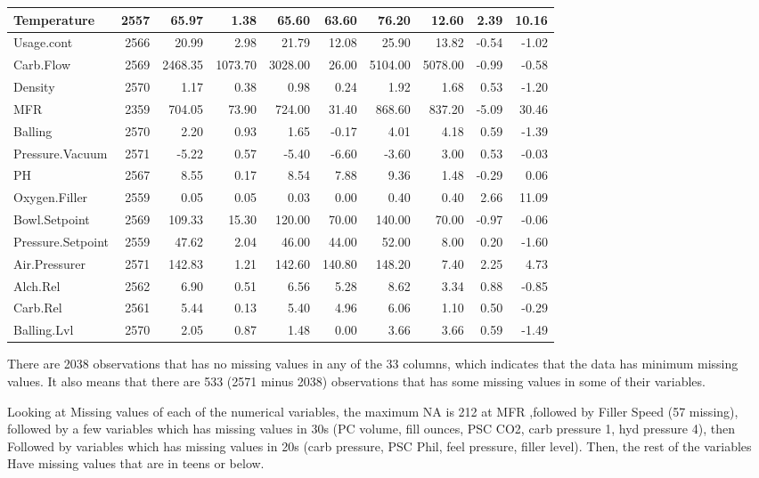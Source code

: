 \documentclass[]{article}
\begin{document}
\begin{table}
\begin{tabular}[t]{l|r|r|r|r|r|r|r|r|r}
\hline
Temperature & 2557 & 65.97 & 1.38 & 65.60 & 63.60 & 76.20 & 12.60 & 2.39 & 10.16\\
\hline
Usage.cont & 2566 & 20.99 & 2.98 & 21.79 & 12.08 & 25.90 & 13.82 & -0.54 & -1.02\\
\hline
Carb.Flow & 2569 & 2468.35 & 1073.70 & 3028.00 & 26.00 & 5104.00 & 5078.00 & -0.99 & -0.58\\
\hline
Density & 2570 & 1.17 & 0.38 & 0.98 & 0.24 & 1.92 & 1.68 & 0.53 & -1.20\\
\hline
MFR & 2359 & 704.05 & 73.90 & 724.00 & 31.40 & 868.60 & 837.20 & -5.09 & 30.46\\
\hline
Balling & 2570 & 2.20 & 0.93 & 1.65 & -0.17 & 4.01 & 4.18 & 0.59 & -1.39\\
\hline
Pressure.Vacuum & 2571 & -5.22 & 0.57 & -5.40 & -6.60 & -3.60 & 3.00 & 0.53 & -0.03\\
\hline
PH & 2567 & 8.55 & 0.17 & 8.54 & 7.88 & 9.36 & 1.48 & -0.29 & 0.06\\
\hline
Oxygen.Filler & 2559 & 0.05 & 0.05 & 0.03 & 0.00 & 0.40 & 0.40 & 2.66 & 11.09\\
\hline
Bowl.Setpoint & 2569 & 109.33 & 15.30 & 120.00 & 70.00 & 140.00 & 70.00 & -0.97 & -0.06\\
\hline
Pressure.Setpoint & 2559 & 47.62 & 2.04 & 46.00 & 44.00 & 52.00 & 8.00 & 0.20 & -1.60\\
\hline
Air.Pressurer & 2571 & 142.83 & 1.21 & 142.60 & 140.80 & 148.20 & 7.40 & 2.25 & 4.73\\
\hline
Alch.Rel & 2562 & 6.90 & 0.51 & 6.56 & 5.28 & 8.62 & 3.34 & 0.88 & -0.85\\
\hline
Carb.Rel & 2561 & 5.44 & 0.13 & 5.40 & 4.96 & 6.06 & 1.10 & 0.50 & -0.29\\
\hline
Balling.Lvl & 2570 & 2.05 & 0.87 & 1.48 & 0.00 & 3.66 & 3.66 & 0.59 & -1.49\\
\hline
\end{tabular}
\end{table}

There are 2038 observations that has no missing values in any of the 33
columns, which indicates that the data has minimum missing values. It
also means that there are 533 (2571 minus 2038) observations that has
some missing values in some of their variables.

Looking at Missing values of each of the numerical variables, the
maximum NA is 212 at MFR ,followed by Filler Speed (57 missing),
followed by a few variables which has missing values in 30s (PC volume,
fill ounces, PSC CO2, carb pressure 1, hyd pressure 4), then Followed by
variables which has missing values in 20s (carb pressure, PSC Phil, feel
pressure, filler level). Then, the rest of the variables Have missing
values that are in teens or below.
\end{document}
